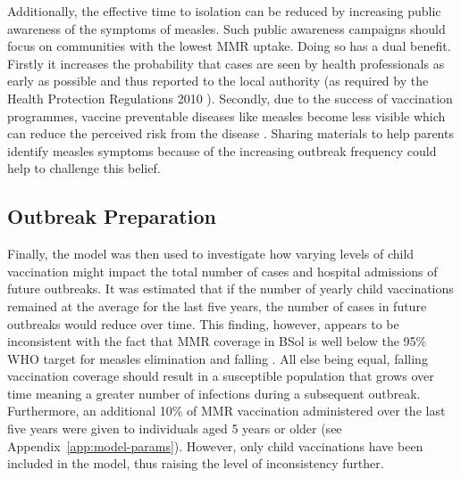 \documentclass[12pt]{article}
\newcounter{who}
\begin{document}
Additionally, the effective time to isolation can be reduced by increasing public awareness of the symptoms of measles. Such public awareness campaigns should focus on communities with the lowest MMR uptake. Doing so has a dual benefit. Firstly it increases the probability that cases are seen by health professionals as early as possible and thus reported to the local authority (as required by the Health Protection Regulations 2010 \cite{hpnr_2010}). Secondly, due to the success of vaccination programmes, vaccine preventable diseases like measles become less visible which can reduce the perceived risk from the disease \cite{Dube08082013}. Sharing materials to help parents identify measles symptoms because of the increasing outbreak frequency could help to challenge this belief.


\subsection{Outbreak Preparation}

Finally, the model was then used to investigate how varying levels of child vaccination might impact the total number of cases and hospital admissions of future outbreaks. It was estimated that if the number of yearly child vaccinations remained at the average for the last five years, the number of cases in future outbreaks would reduce over time. This finding, however, appears to be inconsistent with the fact that MMR coverage in BSol is well below the 95\% WHO target for measles elimination and falling \cite{FTips}. All else being equal, falling vaccination coverage should result in a susceptible population that grows over time meaning a greater number of infections during a subsequent outbreak. Furthermore, an additional 10\% of MMR vaccination administered over the last five years were given to individuals aged 5 years or older (see Appendix~\ref{app:model-params}). However, only child vaccinations have been included in the model, thus raising the level of inconsistency further. 
\end{document}
